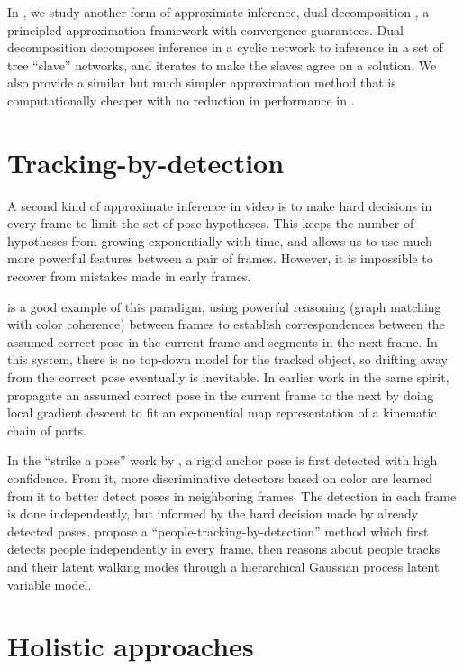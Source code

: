 In , we study another form of approximate inference, dual 
decomposition \citep{komodakis2007}, a principled approximation framework with 
convergence guarantees.  Dual decomposition decomposes inference in a cyclic 
network to inference in a set of tree ``slave'' networks, and iterates to make 
the slaves agree on a solution.  We also provide a similar but much simpler 
approximation method that is computationally cheaper with no reduction in 
performance in .


\section{Tracking-by-detection}  A second kind of approximate inference in 
video is to make hard decisions in every frame to limit the set of pose 
hypotheses.  This keeps the number of hypotheses from growing exponentially 
with time, and allows us to use much more powerful features between a pair of 
frames.  However, it is impossible to recover from mistakes made in early 
frames.

\citet{ren07} is a good example of this paradigm, using powerful reasoning 
(graph matching with color coherence) between frames to establish 
correspondences between the assumed correct pose in the current frame and 
segments in the next frame.  In this system, there is no top-down model for the 
tracked object, so drifting away from the correct pose eventually is 
inevitable.  In earlier work in the same spirit, \citet{bregler98} propagate an 
assumed correct pose in the current frame to the next by doing local gradient 
descent to fit an exponential map representation of a kinematic chain of parts.

In the ``strike a pose'' work by \citet{strikeapose}, a rigid anchor pose is 
first detected with high confidence.  From it, more discriminative detectors 
based on color are learned from it to better detect poses in neighboring 
frames.  The detection in each frame is done independently, but informed by the 
hard decision made by already detected poses. \citet{andriluka2008people} 
propose a ``people-tracking-by-detection'' method which first detects people 
independently in every frame, then reasons about people tracks and their latent 
walking modes through a hierarchical Gaussian process latent variable model.



\section{Holistic approaches}\label{sec:nonpart}


